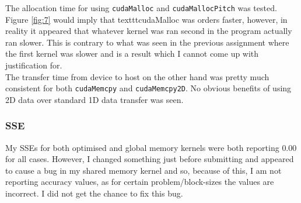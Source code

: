 \documentclass[12pt]{article}
\begin{document}
The allocation time for using \texttt{cudaMalloc} and \texttt{cudaMallocPitch} was tested. Figure \ref{fig:7} would imply that texttt{cudaMalloc} was orders faster, however, in reality it appeared that whatever kernel was ran second in the program actually ran slower. This is contrary to what was seen in the previous assignment where the first kernel was slower and is a result which I cannot come up with justification for.\\
The transfer time from device to host on the other hand was pretty much consistent for both \texttt{cudaMemcpy} and \texttt{cudaMemcpy2D}. No obvious benefits of using 2D data over standard 1D data transfer was seen.
\subsubsection*{SSE}
My SSEs for both optimised and global memory kernels were both reporting $0.00$ for all cases. However, I changed something just before submitting and appeared to cause a bug in my shared memory kernel and so, because of this, I am not reporting accuracy values, as for certain problem/block-sizes the values are incorrect. I did not get the chance to fix this bug.
\pagebreak
\end{document}
